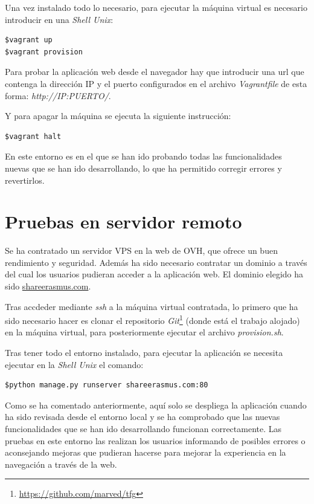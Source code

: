 \documentclass[a4paper, 12pt]{book}
\begin{document}
Una vez instalado todo lo necesario, para ejecutar la máquina virtual es necesario introducir en una \textit{Shell Unix}: \begin{verbatim} 
$vagrant up 
$vagrant provision
\end{verbatim}  

 Para probar la aplicación web desde el navegador hay que introducir una url que contenga la dirección IP y el puerto configurados en el archivo \textit{Vagrantfile} de esta forma: \textit{http://IP:PUERTO/}.
\newline

Y para apagar la máquina se ejecuta la siguiente instrucción:
\begin{verbatim} 
$vagrant halt 
\end{verbatim}  

En este entorno es en el que se han ido probando todas las funcionalidades nuevas que se han ido desarrollando, lo que ha permitido corregir errores y revertirlos.

\section{Pruebas en servidor remoto} 
\label{sec:pruebas-en-servidor-remoto}

Se ha contratado un servidor VPS en la web de OVH, que ofrece un buen rendimiento y seguridad. Además ha sido necesario contratar un dominio a través del cual los usuarios pudieran acceder a la aplicación web. El dominio elegido ha sido \url{shareerasmus.com}.
\newline

Tras accdeder mediante \textit{ssh} a la máquina virtual contratada, lo primero que ha sido necesario hacer es clonar el repositorio \textit{Git}\footnote{\url{https://github.com/marved/tfg}} (donde está el trabajo alojado) en la máquina virtual, para posteriormente ejecutar el archivo \textit{provision.sh}. 
\newline

Tras tener todo el entorno instalado, para ejecutar la aplicación se necesita ejecutar en la \textit{Shell Unix} el comando:
\begin{verbatim} 
$python manage.py runserver shareerasmus.com:80
\end{verbatim}  

Como se ha comentado anteriormente, aquí solo se despliega la aplicación cuando ha sido revisada desde el entorno local y se ha comprobado que las nuevas funcionalidades que se han ido desarrollando funcionan correctamente. Las pruebas en este entorno las realizan los usuarios informando de posibles errores o aconsejando mejoras que pudieran hacerse para mejorar la experiencia en la navegación a través de la web.
\end{document}
